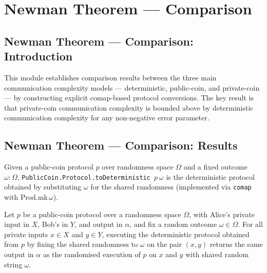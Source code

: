 \section{Newman Theorem --- Comparison}
\subsection*{Newman Theorem --- Comparison: Introduction}

This module establishes comparison results between the three main communication
complexity models — deterministic, public-coin, and private-coin — by constructing
explicit comap-based protocol conversions.  The key result is that private-coin
communication complexity is bounded above by deterministic communication complexity
for any non-negative error parameter.

\subsection*{Newman Theorem --- Comparison: Results}

\begin{definition}
\label{CommunicationComplexity.PublicCoin.Protocol.toDeterministic}
\leanok
{}
Given a public-coin protocol $p$ over randomness space $\Omega$ and a fixed
outcome $\omega : \Omega$, \texttt{PublicCoin.Protocol.toDeterministic}~$p~\omega$
is the deterministic protocol obtained by substituting $\omega$ for the shared
randomness (implemented via \texttt{comap} with $\mathrm{Prod.mk}\,\omega$).
\end{definition}

\begin{theorem}
\label{CommunicationComplexity.PublicCoin.Protocol.toDeterministic_run}
\leanok
{}
Let $p$ be a public-coin protocol over a randomness space $\Omega$, with Alice's private
input in $X$, Bob's in $Y$, and output in $\alpha$, and fix a random outcome $\omega \in
\Omega$. For all private inputs $x \in X$ and $y \in Y$, executing the deterministic
protocol obtained from $p$ by fixing the shared randomness to $\omega$ on the pair $(x,
y)$ returns the same output in $\alpha$ as the randomised execution of $p$ on $x$ and
$y$ with shared random string $\omega$.
\end{theorem}

